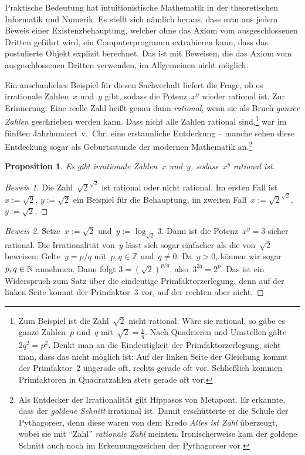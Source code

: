 \documentclass[twoside]{../zirkelblatt}
\newcommand{\ZZ}{\mathbb{Z}}
\theoremstyle{definition}
\theoremstyle{plain}
\newtheorem{prop}[defn]{Proposition}
\theoremstyle{remark}
\begin{document}
Praktische Bedeutung hat intuitionistische Mathematik in der theoretischen
Informatik und Numerik. Es stellt sich nämlich heraus, dass man aus jedem
Beweis einer Existenzbehauptung, welcher ohne das Axiom vom ausgeschlossenen
Dritten geführt wird, ein Computerprogramm extrahieren kann, dass das
postulierte Objekt explizit berechnet. Das ist mit Beweisen, die das Axiom vom
ausgeschlossenen Dritten verwenden, im Allgemeinen nicht möglich.

Ein anschauliches Beispiel für diesen Sachverhalt liefert die Frage, ob
es irrationale Zahlen~$x$ und~$y$ gibt, sodass die Potenz~$x^y$ wieder rational ist.
Zur Erinnerung: Eine reelle Zahl heißt genau dann \emph{rational}, wenn sie
als Bruch \emph{ganzer Zahlen} geschrieben werden kann. Dass nicht alle Zahlen
rational sind,\footnote{Zum Beispiel ist die Zahl~$\sqrt{2}$ nicht rational.
Wäre sie rational, so gäbe es ganze Zahlen~$p$ und~$q$ mit~$\sqrt{2} =
\frac{p}{q}$. Nach Quadrieren und Umstellen gälte~$2q^2 = p^2$. Denkt man an die
Eindeutigkeit der Primfaktorzerlegung, sieht man, dass das nicht möglich ist:
Auf der linken Seite der Gleichung kommt der Primfaktor~$2$ ungerade oft,
rechts gerade oft vor. Schließlich kommen Primfaktoren in Quadratzahlen stets
gerade oft vor.}
war im fünften Jahrhundert~v.~Chr. eine erstaunliche Entdeckung
-- manche sehen diese Entdeckung sogar als Geburtsstunde der modernen
Mathematik an.\footnote{Als Entdecker der Irrationalität gilt Hippasos von
Metapont. Er erkannte, dass der \emph{goldene Schnitt} irrational ist. Damit
erschütterte er die Schule der Pythagoreer, denn diese waren von dem Kredo
\emph{Alles ist Zahl} überzeugt, wobei sie mit "`Zahl"' \emph{rationale Zahl}
meinten. Ironischerweise kam der goldene Schnitt auch noch im Erkennungszeichen der
Pythagoreer vor.}

\begin{prop}Es gibt irrationale Zahlen~$x$ und~$y$, sodass~$x^y$ rational ist.
\end{prop}
\begin{proof}[Beweis 1] Die Zahl~$\sqrt{2}^{\sqrt{2}}$ ist rational oder nicht
rational. Im ersten Fall ist~$x := \sqrt{2}$, $y := \sqrt{2}$ ein Beispiel für
die Behauptung, im zweiten Fall~$x := \sqrt{2}^{\sqrt{2}}$, $y := \sqrt{2}$.
\end{proof}
\begin{proof}[Beweis 2] Setze~$x := \sqrt{2}$ und~$y := \log_{\sqrt{2}} 3$.
Dann ist die Potenz~$x^y = 3$ sicher rational. Die Irrationalität von~$y$ lässt sich
sogar einfacher als die von~$\sqrt{2}$ beweisen:
Gelte~$y = p/q$ mit~$p, q \in \ZZ$ und~$q \neq 0$. Da~$y > 0$, können wir
sogar~$p, q \in \mathbb{N}$ annehmen.
Dann folgt $3 = (\sqrt{2})^{p/q}$, also~$3^{2q} = 2^p$. Das ist ein
Widerspruch zum Satz über die eindeutige Primfaktorzerlegung, denn auf der linken
Seite kommt der Primfaktor~$3$ vor, auf der rechten aber nicht.
\end{proof}
\end{document}
